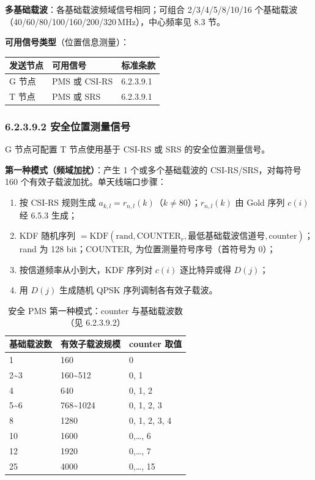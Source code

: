 \documentclass[11pt,a4paper]{ctexart}
\begin{document}
\textbf{多基础载波}：各基础载波频域信号相同；可组合 2/3/4/5/8/10/16 个基础载波（40/60/80/100/160/200/320\,MHz），中心频率见 8.3 节。

\textbf{可用信号类型}（位置信息测量）：
\begin{table}[h]
\centering
\small
\begin{tabular}{lll}
\toprule
\textbf{发送节点} & \textbf{可用信号} & \textbf{标准条款} \\
\midrule
G 节点 & PMS 或 CSI-RS & 6.2.3.9.1 \\
T 节点 & PMS 或 SRS & 6.2.3.9.1 \\
\bottomrule
\end{tabular}
\end{table}

\subsubsection{6.2.3.9.2 安全位置测量信号}

G 节点可配置 T 节点使用基于 CSI-RS 或 SRS 的安全位置测量信号。

\textbf{第一种模式（频域加扰）}：产生 1 个或多个基础载波的 CSI-RS/SRS，对每符号 160 个有效子载波加扰。单天线端口步骤：
\begin{enumerate}[nosep]
  \item 按 CSI-RS 规则生成 $a_{k,l}=r_{n,l}(k)$（$k{\neq}80$）；$r_{n,l}(k)$ 由 Gold 序列 $c(i)$ 经 6.5.3 生成；
  \item KDF 随机序列 $=\mathrm{KDF}(\mathrm{rand}, \mathrm{COUNTER}_r, \text{最低基础载波信道号}, \mathrm{counter})$；rand 为 128 bit；$\mathrm{COUNTER}_r$ 为位置测量符号序号（首符号为 0）；
  \item 按信道频率从小到大，KDF 序列对 $c(i)$ 逐比特异或得 $D(j)$；
  \item 用 $D(j)$ 生成随机 QPSK 序列调制各有效子载波。
\end{enumerate}

\begin{table}[h]
\centering
\small
\caption{安全 PMS 第一种模式：counter 与基础载波数（见 6.2.3.9.2）}
\begin{tabular}{lll}
\toprule
\textbf{基础载波数} & \textbf{有效子载波规模} & \textbf{counter 取值} \\
\midrule
1 & 160 & 0 \\
2\textasciitilde 3 & 160\textasciitilde 512 & 0, 1 \\
4 & 640 & 0, 1, 2 \\
5\textasciitilde 6 & 768\textasciitilde 1024 & 0, 1, 2, 3 \\
8 & 1280 & 0, 1, 2, 3, 4 \\
10 & 1600 & 0,\ldots, 6 \\
12 & 1920 & 0,\ldots, 7 \\
25 & 4000 & 0,\ldots, 15 \\
\bottomrule
\end{tabular}
\end{table}
\end{document}
